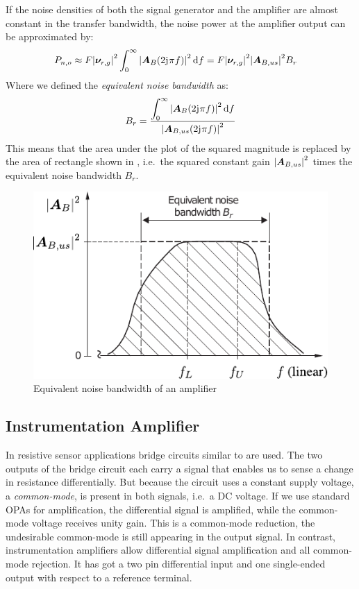 If the noise densities of both the signal generator and the amplifier are almost constant in the transfer bandwidth, the noise power at the amplifier output can be approximated by:
\begin{align}
  P_{n,o} &\approx F\abs{\bm{\nu}_{r,g}}^2\int_0^\infty \abs{\bm{A}_B(2\mathrm{j}\mkern1mu\pi f)}^2\dd{f} = F\abs{\bm{\nu}_{r,g}}^2\abs{\bm{A}_{B,us}}^2 B_r
\end{align}
Where we defined the \emph{equivalent noise bandwidth} as:
\begin{align}
  B_r = \frac{\displaystyle\int_0^\infty \abs{\bm{A}_B(2\mathrm{j}\mkern1mu\pi f)}^2\dd{f}}{\abs{\bm{A}_{B,us}(2\mathrm{j}\mkern1mu\pi f)}^2}
\end{align}
This means that the area under the plot of the squared magnitude is replaced by the area of rectangle shown in , i.e.\ the squared constant gain $\abs{\bm{A}_{B,us}}^2$ times the equivalent noise bandwidth $B_r$.

\begin{figure}[htb!]
  \centering
  \includegraphics[scale=1]{figures/electronics/op_amp/equivalent_noise_bandwidth}
  \caption[Equivalent Noise Bandwidth of an Amplifier]{Equivalent noise bandwidth of an amplifier \cite{Tietze2008EC}%
    \label{fig:equivalent_noise_bandwidth}}
\end{figure}

\subsection{Instrumentation Amplifier}
In resistive sensor applications bridge circuits similar to  are used. The two outputs of the bridge circuit each carry a signal that enables us to sense a change in resistance differentially. But because the circuit uses a constant supply voltage, a \emph{common-mode}, is present in both signals, i.e.\ a \ac{DC} voltage. If we use standard \ac{OPA}s for amplification, the differential signal is amplified, while the common-mode voltage receives unity gain. This is a common-mode reduction, the undesirable common-mode is still appearing in the output signal. In contrast, instrumentation amplifiers allow differential signal amplification and all common-mode rejection. It has got a two pin differential input and one single-ended output with respect to a reference terminal.

